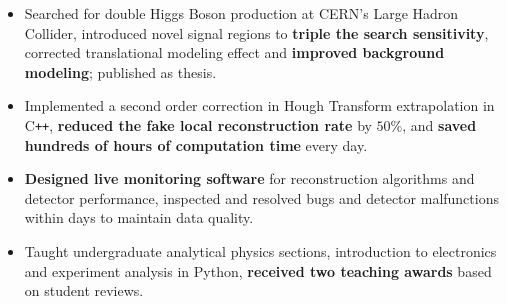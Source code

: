 \documentclass[letterpaper,11pt,oneside]{article}
\begin{document}
 \begin{flushleft}
  \begin{small}
 \begin{itemize}[leftmargin=*]
  \item Searched for double Higgs Boson production at CERN's Large Hadron Collider, introduced novel signal regions to \textbf{triple the search sensitivity}, corrected translational modeling effect and \textbf{improved background modeling}; published as thesis.
  \item Implemented a second order correction in Hough Transform extrapolation in C\texttt{++}, \textbf{reduced the fake local reconstruction rate} by $50\%$, and \textbf{saved hundreds of hours of computation time} every day.
   \item\textbf{Designed live monitoring software} for reconstruction algorithms and detector performance, inspected and resolved bugs and detector malfunctions within days to maintain data quality.
  \item Taught undergraduate analytical physics sections, introduction to electronics and experiment analysis in Python, \textbf{received two teaching awards} based on student reviews.
 \end{itemize}
  \end{small}
 \end{flushleft}
\end{document}
